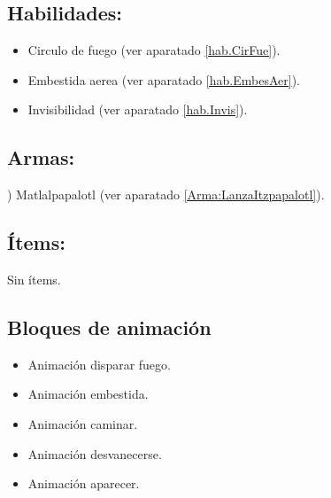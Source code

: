 \subsection{Habilidades:}
\begin{itemize}
	\item Circulo de fuego (ver aparatado \ref{hab.CirFue}).
	\item Embestida aerea (ver aparatado \ref{hab.EmbesAer}).
	\item Invisibilidad (ver aparatado \ref{hab.Invis}).
\end{itemize}
\subsection{Armas:})
Matlalpapalotl (ver aparatado \ref{Arma:LanzaItzpapalotl}).
\subsection{Ítems:}
Sin ítems.

\subsection{Bloques de animación}
 	\begin{itemize}
		\item Animación disparar fuego.
		\item Animación embestida.
		\item Animación caminar.
		\item Animación desvanecerse.
		\item Animación aparecer.
    \end{itemize}